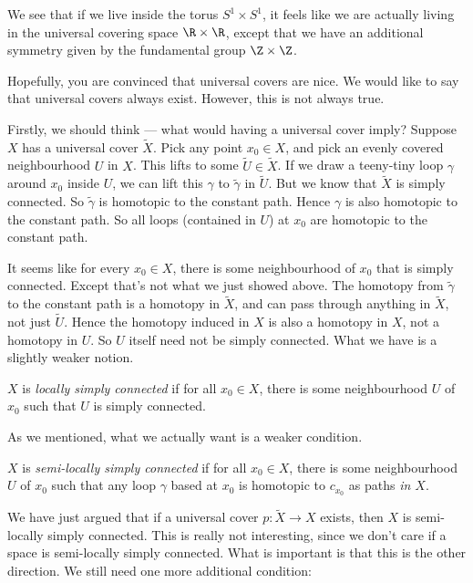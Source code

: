 \documentclass[a4paper]{article}
\begin{document}
We see that if we live inside the torus $S^1 \times S^1$, it feels like we are actually living in the universal covering space $\R \times \R$, except that we have an additional symmetry given by the fundamental group $\Z \times \Z$.

Hopefully, you are convinced that universal covers are nice. We would like to say that universal covers always exist. However, this is not always true.

Firstly, we should think --- what would having a universal cover imply? Suppose $X$ has a universal cover $\tilde{X}$. Pick any point $x_0 \in X$, and pick an evenly covered neighbourhood $U$ in $X$. This lifts to some $\tilde{U} \in \tilde{X}$. If we draw a teeny-tiny loop $\gamma$ around $x_0$ inside $U$, we can lift this $\gamma$ to $\tilde{\gamma}$ in $\tilde{U}$. But we know that $\tilde{X}$ is simply connected. So $\tilde{\gamma}$ is homotopic to the constant path. Hence $\gamma$ is also homotopic to the constant path. So all loops (contained in $U$) at $x_0$ are homotopic to the constant path.

It seems like for every $x_0 \in X$, there is some neighbourhood of $x_0$ that is simply connected. Except that's not what we just showed above. The homotopy from $\tilde{\gamma}$ to the constant path is a homotopy in $\tilde{X}$, and can pass through anything in $\tilde{X}$, not just $\tilde{U}$. Hence the homotopy induced in $X$ is also a homotopy in $X$, not a homotopy in $U$. So $U$ itself need not be simply connected. What we have is a slightly weaker notion.

\begin{defi}
  $X$ is \emph{locally simply connected} if for all $x_0\in X$, there is some neighbourhood $U$ of $x_0$ such that $U$ is simply connected.
\end{defi}

As we mentioned, what we actually want is a weaker condition.
\begin{defi}
  $X$ is \emph{semi-locally simply connected} if for all $x_0 \in X$, there is some neighbourhood $U$ of $x_0$ such that any loop $\gamma$ based at $x_0$ is homotopic to $c_{x_0}$ as paths \emph{in $X$}.
\end{defi}

We have just argued that if a universal cover $p: \tilde{X} \to X$ exists, then $X$ is semi-locally simply connected. This is really not interesting, since we don't care if a space is semi-locally simply connected. What is important is that this is the other direction. We still need one more additional condition:
\end{document}
